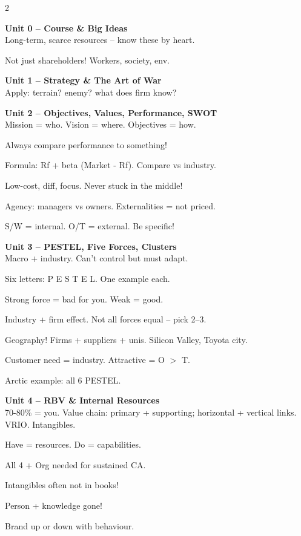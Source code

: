 \documentclass[8pt,landscape,a4paper]{article}
\begin{document}
\newpage
\vspace*{0.3em}
\noindent\color{noteblue}
\setlength{\parskip}{0.3em}
\begin{multicols}{2}

\textbf{Unit 0 -- Course \& Big Ideas}\\
Long-term, scarce resources -- know these by heart.

Not just shareholders! Workers, society, env.

\textbf{Unit 1 -- Strategy \& The Art of War}\\
Apply: terrain? enemy? what does firm know?

\textbf{Unit 2 -- Objectives, Values, Performance, SWOT}\\
Mission = who. Vision = where. Objectives = how.

Always compare performance to something!

Formula: Rf + beta (Market - Rf). Compare vs industry.

Low-cost, diff, focus. Never stuck in the middle!

Agency: managers vs owners. Externalities = not priced.

S/W = internal. O/T = external. Be specific!

\textbf{Unit 3 -- PESTEL, Five Forces, Clusters}\\
Macro + industry. Can't control but must adapt.

Six letters: P E S T E L. One example each.

Strong force = bad for you. Weak = good.

Industry + firm effect. Not all forces equal -- pick 2--3.

Geography! Firms + suppliers + unis. Silicon Valley, Toyota city.

Customer need = industry. Attractive = O $>$ T.

Arctic example: all 6 PESTEL.

\textbf{Unit 4 -- RBV \& Internal Resources}\\
70-80\% = you. Value chain: primary + supporting; horizontal + vertical links. VRIO. Intangibles.

Have = resources. Do = capabilities.

All 4 + Org needed for sustained CA.

Intangibles often not in books!

Person + knowledge gone!

Brand up or down with behaviour.


\end{multicols}
\end{document}
